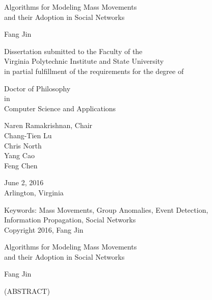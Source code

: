 \documentclass[12pt,dvips]{report}
\begin{document}
\thispagestyle{empty}
\begin{center}

{\Large
Algorithms for Modeling Mass Movements \\
and their Adoption in Social Networks
}


\vfill

Fang Jin

\vfill

Dissertation submitted to the Faculty of the \\
Virginia Polytechnic Institute and State University \\
in partial fulfillment of the requirements for the degree of

\vfill

Doctor of Philosophy \\
in \\
Computer Science and Applications

\vfill

Naren Ramakrishnan, Chair \\
Chang-Tien Lu \\
Chris North \\
Yang Cao \\
Feng Chen

\vfill

June 2, 2016\\
Arlington, Virginia

\vfill

Keywords: Mass Movements, Group Anomalies, Event Detection, \\ Information Propagation, Social Networks
\\
Copyright 2016, Fang Jin

\end{center}

\pagebreak

\thispagestyle{empty}
\begin{center}

{\large
Algorithms for Modeling Mass Movements \\ and their Adoption in Social Networks
}

\vfill

Fang Jin

\vfill

(ABSTRACT)
\vfill

\end{center}
\end{document}
